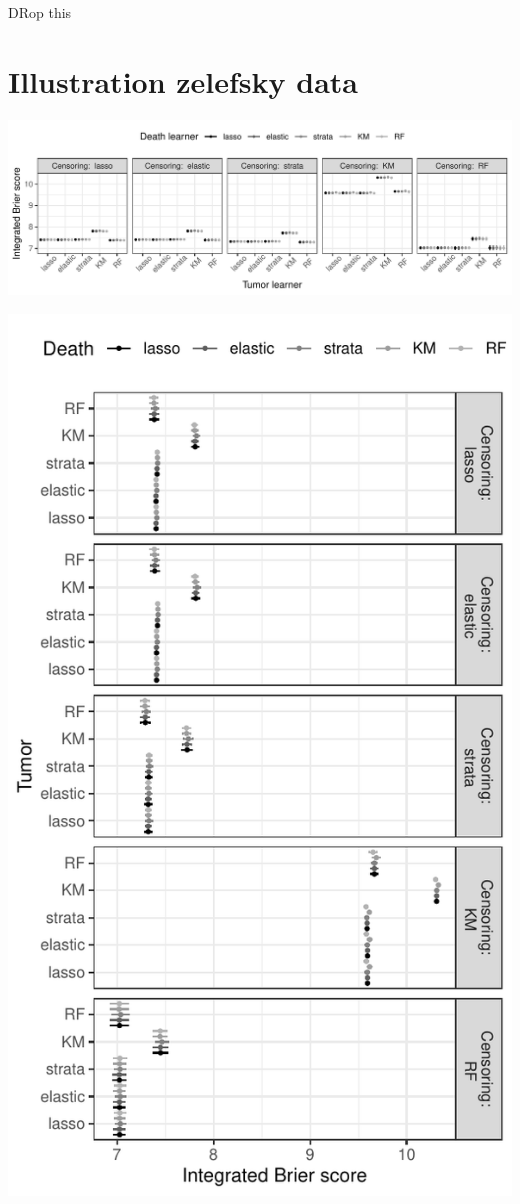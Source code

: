 \documentclass[11pt]{article}
\begin{document}
DRop this

\section{Illustration zelefsky data}
\label{sec:orgbf55166}

\begin{center}
\includegraphics[width=.9\linewidth]{zelefski-real-data.pdf}
\end{center}


\begin{center}
\includegraphics[width=.9\linewidth]{zelefski-real-data-flip.pdf}
\end{center}
\end{document}
